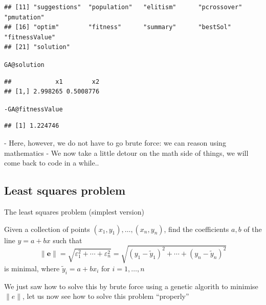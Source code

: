 \documentclass[aspectratio=169]{beamer}\usepackage[]{graphicx}\usepackage[]{xcolor}
\makeatletter
\newcommand{\hlopt}[1]{\textcolor[rgb]{0,0,0}{#1}}%
\newcommand{\hldef}[1]{\textcolor[rgb]{0.345,0.345,0.345}{#1}}%
\newcommand{\hlkwc}[1]{\textcolor[rgb]{0.333,0.667,0.333}{#1}}%
\newenvironment{kframe}{%
 \def\at@end@of@kframe{}%
 \ifinner\ifhmode%
  \def\at@end@of@kframe{\end{minipage}}%
  \begin{minipage}{\columnwidth}%
 \fi\fi%
 \def\FrameCommand##1{\hskip\@totalleftmargin \hskip-\fboxsep
 \colorbox{shadecolor}{##1}\hskip-\fboxsep
     \hskip-\linewidth \hskip-\@totalleftmargin \hskip\columnwidth}%
 \MakeFramed {\advance\hsize-\width
   \@totalleftmargin\z@ \linewidth\hsize
   \@setminipage}}%
 {\par\unskip\endMakeFramed%
 \at@end@of@kframe}
\newenvironment{knitrout}{}{} %
\makeatother
\begin{document}
\begin{frame}[fragile]
\begin{knitrout}
\begin{kframe}
\begin{verbatim}
## [11] "suggestions"  "population"   "elitism"      "pcrossover"   "pmutation"   
## [16] "optim"        "fitness"      "summary"      "bestSol"      "fitnessValue"
## [21] "solution"
\end{verbatim}
\begin{alltt}
\hldef{GA}\hlopt{@}\hlkwc{solution}
\end{alltt}
\begin{verbatim}
##            x1        x2
## [1,] 2.998265 0.5008776
\end{verbatim}
\begin{alltt}
\hlopt{-}\hldef{GA}\hlopt{@}\hlkwc{fitnessValue}
\end{alltt}
\begin{verbatim}
## [1] 1.224746
\end{verbatim}
\end{kframe}
\end{knitrout}

- Here, however, we do not have to go brute force: we can reason using mathematics
- We now take a little detour on the math side of things, we will come back to code in a while..
\end{frame}



\subsection{Least squares problem}

\begin{frame}{The least squares problem (simplest version)}
	\begin{definition}
		Given a collection of points $(x_1,y_1),\ldots,(x_n,y_n)$, find the coefficients $a,b$ of the line $y=a+bx$ such that
		$$
		\|\mathbf{e}\|=\sqrt{\varepsilon_1^2+\cdots+\varepsilon_n^2}
		=\sqrt{(y_1-\tilde y_1)^2+\cdots+(y_n-\tilde y_n)^2}
		$$
		is minimal, where $\tilde y_i=a+bx_i$ for $i=1,\ldots,n$
	\end{definition}
	\vfill
	We just saw how to solve this by brute force using a genetic algorith to minimise $\|e\|$, let us now see how to solve this problem ``properly''
\end{frame}
\end{document}
